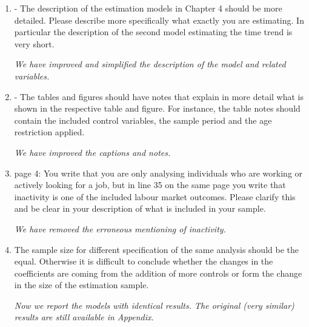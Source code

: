 \documentclass{article}
\newenvironment{response}
{\slshape}{}
\begin{document}
\begin{enumerate}
\item- The description of the estimation models in Chapter 4 should
  be more detailed. Please describe more specifically what exactly you
  are estimating. In particular the description of the second model
  estimating the time trend is very short.

  \begin{response}
    We have improved and simplified the description of the model and related variables.
  \end{response}
\item - The tables and figures should have notes that explain in more
  detail what is shown in the respective table and figure. For
  instance, the table notes should contain the included control
  variables, the sample period and the age restriction applied.

  \begin{response}
    We have improved the captions and notes.
  \end{response}

\item page 4: You write that you are only analysing individuals who are
working or actively looking for a job, but in line 35 on the same page
you write that inactivity is one of the included labour market
outcomes. Please clarify this and be clear in your description of what
is included in your sample.

\begin{response}
  We have removed the erroneous mentioning of inactivity. 
\end{response}
\item  The sample size for different specification of the same analysis
  should be the equal. Otherwise it is difficult to conclude whether the
  changes in the coefficients are coming from the addition of more
  controls or form the change in the size of the estimation sample.

  \begin{response}
    Now we report the models with identical results.  The original
    (very similar)
    results are still available in Appendix.
  \end{response}


\end{enumerate}
\end{document}
